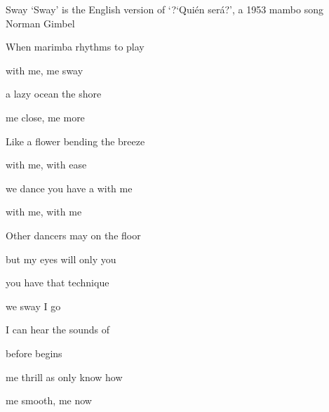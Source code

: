 \begin{SBSong}{Sway}
  {`Sway' is the English version of `?`Qui\'en ser\'a?', a 1953 mambo song}
  {Norman Gimbel}
  \begin{SBVerse}
    When marimba rhythms  to play

     with me,  me sway
    
     a lazy ocean  the shore
    
     me close,  me more 
  \end{SBVerse}
  \begin{SBVerse}
    Like a flower bending  the breeze
    
     with me,  with ease
    
     we dance you have a  with me
    
     with me,  with me 
  \end{SBVerse}
  \begin{SBVerse}
    Other dancers may  on the floor
    
     but my eyes will  only you
    
     you have that  technique
    
     we sway I go  
  \end{SBVerse}
  \begin{SBVerse}
    I can hear the sounds of 
    
     before  begins
    
     me thrill as only  know how
    
     me smooth,  me now 
  \end{SBVerse}
\end{SBSong}
